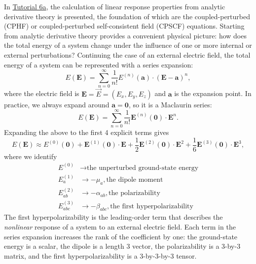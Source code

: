 In \href{https://github.com/psi4/psi4numpy/blob/066f378f26240a4802371ef32849230853581329/Tutorials/06_Molecular_Properties/6a_CP-SCF.ipynb}{Tutorial 6a}, the calculation of linear response properties from analytic derivative theory is presented, the foundation of which are the coupled-perturbed \hf{} (CPHF) or coupled-perturbed self-consistent field (CPSCF) equations. Starting from analytic derivative theory provides a convenient physical picture: how does the total energy of a system change under the influence of one or more internal or external perturbations? Continuing the case of an external electric field, the total energy of a system can be represented with a series expansion:
\begin{equation}
  E(\mathbf{E}) = \sum_{n=0}^{\infty} \frac{1}{n!}E^{(n)}(\mathbf{a})\cdot(\mathbf{E}-\mathbf{a})^{n},
\end{equation}
where the electric field is \(\mathbf{E} = \vec{E} = (E_x,E_y,E_z)\) and \(\mathbf{a}\) is the expansion point. In practice, we always expand around \(\mathbf{a} = \mathbf{0}\), so it is a Maclaurin series:
\begin{equation}
  E(\mathbf{E}) = \sum_{n=0}^{\infty} \frac{1}{n!}\mathbf{E}^{(n)}(\mathbf{0})\cdot\mathbf{E}^{n}.
\end{equation}
Expanding the above to the first 4 explicit terms gives
\begin{equation}
  E(\mathbf{E}) \approx E^{(0)}(\mathbf{0}) + \mathbf{E}^{(1)}(\mathbf{0})\cdot\mathbf{E} + \frac{1}{2}\mathbf{E}^{(2)}(\mathbf{0})\cdot\mathbf{E}^{2} + \frac{1}{6}\mathbf{E}^{(3)}(\mathbf{0})\cdot\mathbf{E}^{3},
\end{equation}
where we identify
\begin{align}
E^{(0)} &\rightarrow \text{the unperturbed ground-state energy} \\
E_{a}^{(1)} &\rightarrow -\mu_{a},\text{the dipole moment} \\
E_{ab}^{(2)} &\rightarrow -\alpha_{ab},\text{the polarizability} \\
E_{abc}^{(3)} &\rightarrow -\beta_{abc},\text{the first hyperpolarizability}
\end{align}
The first hyperpolarizability is the leading-order term that describes the \emph{nonlinear} response of a system to an external electric field.  Each term in the series expansion increases the rank of the coefficient by one: the ground-state energy is a scalar, the dipole is a length 3 vector, the polarizability is a 3-by-3 matrix, and the first hyperpolarizability is a 3-by-3-by-3 tensor.

